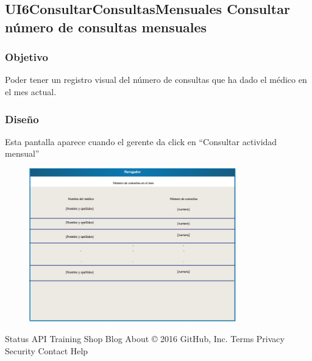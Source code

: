  
 \subsection{UI6ConsultarConsultasMensuales Consultar número de consultas mensuales}
\subsubsection{Objetivo}
Poder tener un registro visual del número de consultas que ha dado el médico en el mes actual.
\subsubsection{Diseño}
   Esta pantalla aparece cuando el gerente da click en ``Consultar actividad mensual'' 


\begin{figure}[htbp!]
        \centering
            \includegraphics[width=0.8\textwidth]{images/consultaCitasMes}
            
            
    \end{figure}



Status API Training Shop Blog About
© 2016 GitHub, Inc. Terms Privacy Security Contact Help

